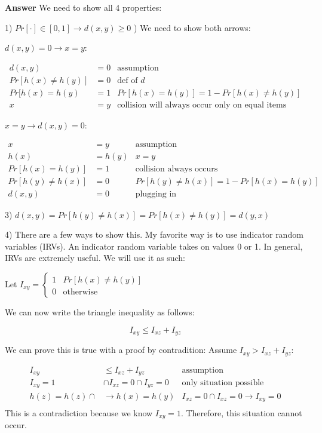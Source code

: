 \documentclass[11pt]{article}
\begin{document}
\noindent\textbf{Answer}
We need to show all 4 properties:

1) $Pr[\cdot] \in [0,1] \rightarrow d(x,y) \ge 0$
\newline{}) We need to show both arrows:


$d(x,y) = 0 \rightarrow x = y$:

\begin{align*}
d(x,y) &= 0 &\text{assumption}\\
Pr[h(x)\neq h(y)] &= 0 &\text{def of }d\\
Pr[h(x) = h(y) &= 1 &Pr[h(x) = h(y)] = 1-Pr[h(x)\neq h(y)]\\
x &= y & \text{collision will always occur only on equal items}
\end{align*}

$x = y \rightarrow d(x,y) = 0$:

\begin{align*}
x &= y &\text{assumption}\\
h(x) &= h(y) &x = y\\
Pr[h(x) = h(y)] &= 1 &\text{collision always occurs}\\
Pr[h(y) \neq h(x)] &= 0 &Pr[h(y)\neq h(x)] = 1-Pr[h(x) = h(y)]\\
d(x,y) &= 0 &\text{plugging in}
\end{align*}
\newline\newline

3) $d(x,y) = Pr[h(y)\neq h(x)] = Pr[h(x)\neq h(y)] = d(y,x)$
\newline\newline

4) There are a few ways to show this. My favorite way is to use indicator random variables (IRVs). An indicator random variable takes on values 0 or 1. In general, IRVs are extremely useful. We will use it as such:

Let $I_{xy} = \begin{cases}
1 & Pr[h(x) \neq h(y)]\\
0 & \text{otherwise}
\end{cases}$

We can now write the triangle inequality as follows:

$$I_{xy} \le I_{xz} + I_{yz}$$

We can prove this is true with a proof by contradition:
Assume $I_{xy} > I_{xz} + I_{yz}$:

\begin{align*}
I_{xy} &\le I_{xz} + I_{yz} &\text{assumption}\\
I_{xy} = 1 &\cap I_{xz} = 0 \cap I_{yz} = 0 &\text{only situation possible}\\
h(z) = h(z) \cap &\rightarrow h(x) = h(y) &I_{xz} = 0\cap I_{xz} = 0 \rightarrow I_{xy} = 0\\
\end{align*}
This is a contradiction because we know $I_{xy} = 1$. Therefore, this situation cannot occur.
\end{document}
